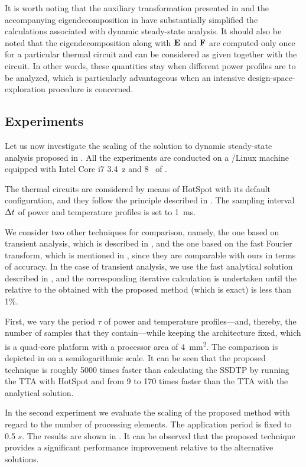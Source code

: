 It is worth noting that the auxiliary transformation presented in
 and the accompanying eigendecomposition in
 have substantially simplified the calculations
associated with dynamic steady-state analysis. It should also be noted that the
eigendecomposition along with $\mathbf{E}$ and $\mathbf{F}$ are computed only once for a
particular thermal  circuit and can be considered as given together with
the circuit. In other words, these quantities stay when different power profiles
are to be analyzed, which is particularly advantageous when an intensive
design-space-exploration procedure is concerned.

\subsection{Experiments}

Let us now investigate the scaling of the solution to dynamic steady-state
analysis proposed in . All the experiments
are conducted on a /Linux machine equipped with Intel Core i7
3.4~z and 8~ of .

The thermal  circuits are considered by means of HotSpot
\cite{skadron2003} with its default configuration, and they follow the principle
described in . The sampling interval $\Delta t$ of power and
temperature profiles is set to 1~ms.

We consider two other techniques for comparison, namely, the one based on
transient analysis, which is described in , and
the one based on the fast Fourier transform, which is mentioned in
, since they are comparable with ours in
terms of accuracy. In the case of transient analysis, we use the fast analytical
solution described in , and the corresponding
iterative calculation is undertaken until the  relative to the
 obtained with the proposed method (which is exact) is less than 1\%.

First, we vary the period $\tau$ of power and temperature profiles---and,
thereby, the number of samples \ns that they contain---while keeping the
architecture fixed, which is a quad-core platform with a processor area of
4~mm\textsuperscript{2}. The comparison is depicted in  on a
semilogarithmic scale. It can be seen that the proposed technique is roughly
5000 times faster than calculating the SSDTP by running the TTA with HotSpot and
from 9 to 170 times faster than the TTA with the analytical solution.

In the second experiment we evaluate the scaling of the proposed method with
regard to the number of processing elements. The application period is fixed to
0.5 $s$. The results are shown in . It can be observed that
the proposed technique provides a significant performance improvement relative
to the alternative solutions.

